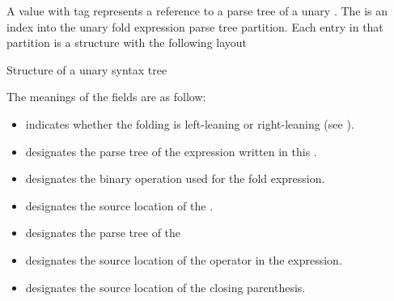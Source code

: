 A  value with tag  represents a reference
to a parse tree of a unary .  
The  is an index into the unary fold expression parse tree
partition. Each entry in that partition is a structure with the following layout
%
\begin{Structure}
	\caption{Structure of a unary  syntax tree}
	\label{fig:ifc:SyntaxSort:UnaryFoldExpression}
\end{Structure}
%
The meanings of the fields are as follow:
\begin{itemize}
	\item {} indicates whether the folding is left-leaning or right-leaning 
		(see ).
	\item {} designates the parse tree of the expression written in this .
	\item {} designates the binary operation used for the fold expression.
	\item {} designates the source location of the .
	\item {} designates the parse tree of the 
	\item {} designates the source location of the operator in the expression.
	\item {} designates the source location of the closing parenthesis.
\end{itemize}



\subsection{}
\label{sec:ifc:SyntaxSort:BinaryFoldExpression}

